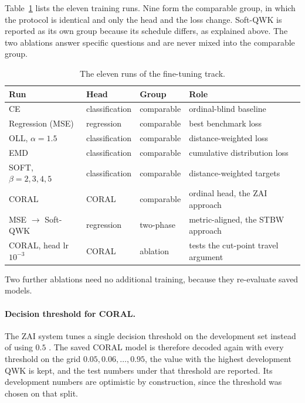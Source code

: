 Table~\ref{tab:meth-methods} lists the eleven training runs. Nine form the comparable group, in
which the protocol is identical and only the head and the loss change. Soft-QWK is reported as
its own group because its schedule differs, as explained above. The two ablations answer
specific questions and are never mixed into the comparable group.

\begin{table}[H]
\centering
\footnotesize
\caption{The eleven runs of the fine-tuning track.}
\label{tab:meth-methods}
\begin{tabular}{p{3.4cm} p{1.7cm} p{2.0cm} p{5.6cm}}
\toprule
\textbf{Run} & \textbf{Head} & \textbf{Group} & \textbf{Role} \\
\midrule
CE & classification & comparable & ordinal-blind baseline \\
Regression (MSE) & regression & comparable & best benchmark loss \\
OLL, $\alpha=1.5$ & classification & comparable & distance-weighted loss \\
EMD & classification & comparable & cumulative distribution loss \\
SOFT, $\beta=2,3,4,5$ & classification & comparable & distance-weighted targets \\
CORAL & CORAL & comparable & ordinal head, the ZAI approach \\
MSE $\rightarrow$ Soft-QWK & regression & two-phase & metric-aligned, the STBW approach \\
CORAL, head lr $10^{-3}$ & CORAL & ablation & tests the cut-point travel argument \\
\bottomrule
\end{tabular}
\end{table}

Two further ablations need no additional training, because they re-evaluate saved models.

\paragraph{Decision threshold for CORAL.} The ZAI system tunes a single decision threshold on
the development set instead of using $0.5$ \cite{nazzal2025zai}. The saved CORAL model is
therefore decoded again with every threshold on the grid $0.05, 0.06, \dots, 0.95$, the value
with the highest development QWK is kept, and the test numbers under that threshold are
reported. Its development numbers are optimistic by construction, since the threshold was
chosen on that split.


